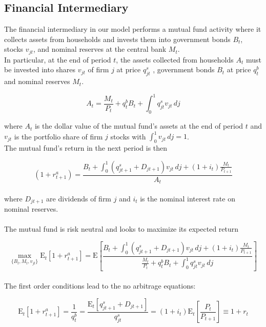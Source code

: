 \documentclass[titlepage]{\econtex}\providecommand{\texname}{BufferStockTheory}
\begin{document}
\hypertarget{Financial Intermediary}{}
\subsection{Financial Intermediary}

\label{subsec:Financial Intermediary}

The financial intermediary in our model performs a mutual fund activity where it  collects assets from households and invests them into government bonds $B_{t}$, stocks $v_{jt}$, and nominal reserves at the central bank $M_{t}$.\\ 

In particular, at the end of period $t$, the assets collected from households $A_{t}$ must be invested into shares $\mathit{v}_{jt}$ of firm $j$ at price  $q^{s}_{jt}$ , government bonds $B_{t}$ at price $q^{b}_{t}$ and nominal reserves $M_{t}$. 

$$A_{t} = \frac{M_{t}}{P_{t}} +q^{b}_{t} B_{t} + \int_{0}^{1} q^{s}_{jt}\mathit{v}_{jt}\,dj$$

where $A_{t} $ is the dollar value of the mutual fund's assets at the end of period $t$ and $ \mathit{v}_{jt}$ is the portfolio share of firm $j$ stocks with $\int_{0}^{1} \mathit{v}_{jt}\,dj =1$.  \\

The mutual fund's return in the next period is then 

$$(1+r^{a}_{t+1})  = \frac{  B_{t} + \int_{0}^{1} (q^{s}_{jt+1}+ D_{jt+1})\mathit{v}_{jt} \, dj +(1+i_{t}) \frac{M_{t}}{P_{t+1}}}{A_{t}}$$\\ 

where  $D_{jt+1}$ are dividends of firm $j$ and $i_{t}$ is the nominal interest rate  on nominal reserves. \\ \\

The mutual fund is risk neutral and looks to maximize its expected return 


$$\max_{\{B_{t}, M_{t} , \mathit{v}_{jt} \}} \mathrm{E}_{t}\left[1+r^{a}_{t+1} \right] = \mathrm{E}\left[ \frac{ B_{t} + \int_{0}^{1} (q^{s}_{jt+1}+ D_{jt+1})\mathit{v}_{jt} \, dj +(1+i_{t}) \frac{M_{t}}{P_{t+1}}}{\frac{M_{t}}{P_{t}} +q^{b}_{t} B_{t} + \int_{0}^{1} q^{s}_{jt}\mathit{v}_{jt}\,dj} \right]$$ \\

 
The first order conditions lead to the no arbitrage equations:

$$ \mathrm{E}_{t}\left[1+r^{a}_{t+1}\right]= \frac{1}{q^{b}_{t}}  =\frac{\mathrm{E}_{t}\left[q^{s}_{jt+1} + D_{jt+1} \right]}{q^{s}_{jt}} = (1+i_{t}) \mathrm{E}_{t}\left[\frac{P_{t}}{P_{t+1}}\right] \equiv 1 +r_{t}$$
\end{document}
